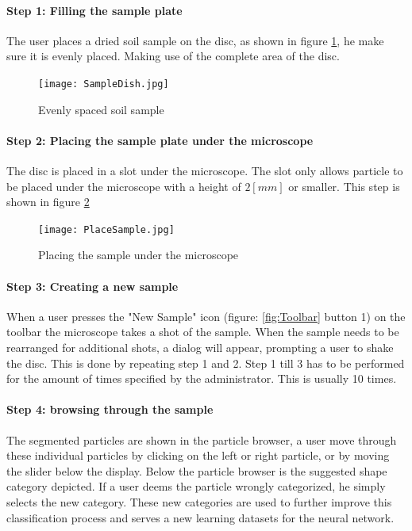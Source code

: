 \documentclass[11pt,fleqn,,a4paper,twoside,openright]{book}
\begin{document}
\paragraph{Step 1: Filling the sample plate}
The user places a dried soil sample on the disc, as shown in figure \ref{fig:SampleDish}, he make sure it is evenly placed. Making use of the complete area of the disc.
\begin{figure}[H]
	\centering
	\texttt{[image: SampleDish.jpg]}
	\caption{Evenly spaced soil sample}\label{fig:SampleDish}
\end{figure}

\newpage
\paragraph{Step 2: Placing the sample plate under the microscope}
The disc is placed in a slot under the microscope. The slot only allows particle to be placed under the microscope  with a height of $ 2 [mm] $ or smaller. This step is shown in figure \ref{fig:PlacementSample}
\begin{figure}[H]
	\centering
	\texttt{[image: PlaceSample.jpg]}
	\caption{Placing the sample under the microscope}\label{fig:PlacementSample}
\end{figure}

\paragraph{Step 3: Creating a new sample}
When a user presses the "New Sample" icon (figure: \ref{fig:Toolbar} button 1) on the toolbar the microscope takes a shot of the sample. When the sample needs to be rearranged for additional shots, a dialog will appear, prompting a user to shake the disc. This is done by repeating step 1 and 2. Step 1 till 3 has to be performed for the amount of times specified by the administrator. This is usually 10 times.

\paragraph{Step 4: browsing through the sample}
The segmented particles are shown in the particle browser, a user move through these individual particles by clicking on the left or right particle, or by moving the slider below the display. Below the particle browser is the suggested shape category depicted. If a user deems the particle wrongly categorized, he simply selects the new category. These new categories are used to further improve this classification process and serves a new learning datasets for the neural network.
\end{document}
